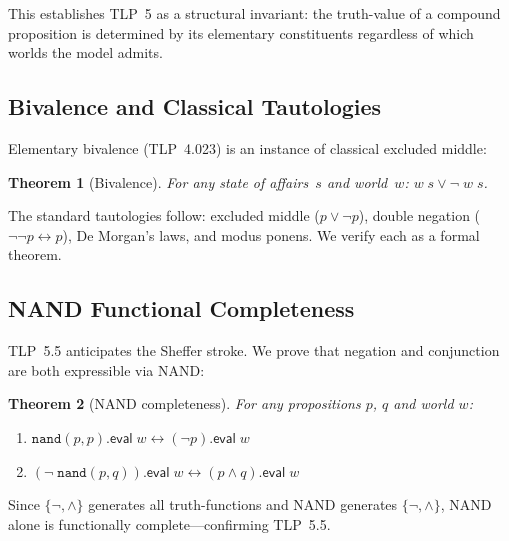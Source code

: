 \documentclass[10pt, letterpaper]{article}
\newtheorem{theorem}{Theorem}[section]
\theoremstyle{definition}
\theoremstyle{remark}
\newcommand{\eval}{\mathsf{eval}}
\begin{document}
\noindent
This establishes TLP~5 as a structural invariant: the
truth-value of a compound proposition is determined by its
elementary constituents regardless of which worlds the model
admits.

\subsection{Bivalence and Classical Tautologies}
\label{sec:bivalence}

Elementary bivalence (TLP~4.023) is an instance of classical
excluded middle:

\begin{theorem}[Bivalence]
For any state of affairs~$s$ and world~$w$: $w\;s \lor \lnot\;w\;s$.
\end{theorem}

\noindent
The standard tautologies follow: excluded middle ($p \lor
\lnot p$), double negation ($\lnot\lnot p \leftrightarrow p$),
De Morgan's laws, and modus ponens.  We verify each as a formal
theorem.

\subsection{NAND Functional Completeness}
\label{sec:nand}

TLP~5.5 anticipates the Sheffer stroke.  We prove that negation
and conjunction are both expressible via NAND:

\begin{theorem}[NAND completeness]
\label{thm:nand}
For any propositions $p$, $q$ and world $w$:
\begin{enumerate}[nosep]
  \item $\mathtt{nand}(p, p).\eval\;w \leftrightarrow
    (\lnot p).\eval\;w$
  \item $(\lnot\;\mathtt{nand}(p, q)).\eval\;w \leftrightarrow
    (p \land q).\eval\;w$
\end{enumerate}
\end{theorem}

\noindent
Since $\{\lnot, \land\}$ generates all truth-functions and NAND
generates $\{\lnot, \land\}$, NAND alone is functionally
complete---confirming TLP~5.5.

\end{document}
